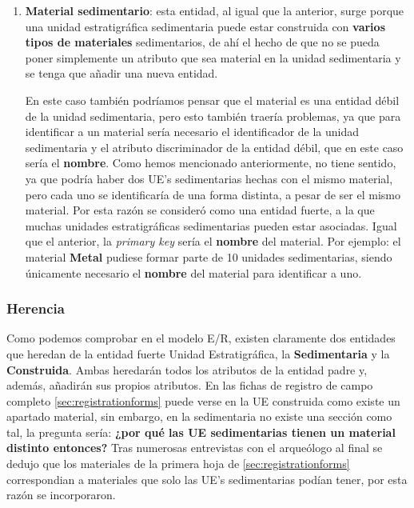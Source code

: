\begin{enumerate}
        \item \textbf{Material sedimentario}: esta entidad, al igual que la anterior, surge
        porque una unidad estratigráfica sedimentaria puede estar construida con 
        \textbf{varios tipos de materiales} sedimentarios, de ahí el hecho de que no se pueda
        poner simplemente un atributo que sea material en la unidad sedimentaria y se tenga que
        añadir una nueva entidad.

        En este caso también podríamos pensar que el material es una entidad débil de la unidad
        sedimentaria, pero esto también traería problemas, ya que para identificar a un material
        sería necesario el identificador de la unidad sedimentaria y el atributo discriminador
        de la entidad débil, que en este caso sería el \textbf{nombre}. Como hemos mencionado
        anteriormente, no tiene sentido, ya que podría haber dos UE's sedimentarias hechas
        con el mismo material, pero cada uno se identificaría de una forma distinta, a pesar
        de ser el mismo material. Por esta razón se consideró como una entidad fuerte, a la
        que muchas unidades estratigráficas sedimentarias pueden estar asociadas. Igual que el
        anterior, la \textit{primary key} sería el \textbf{nombre} del material. Por ejemplo: el
        material \textbf{Metal} pudiese formar parte de 10 unidades sedimentarias, siendo
        únicamente necesario el \textbf{nombre} del material para identificar a uno. 
    \end{enumerate}

    \subsubsection{Herencia}
    Como podemos comprobar en el modelo E/R, existen claramente dos entidades que heredan de
    la entidad fuerte Unidad Estratigráfica, la \textbf{Sedimentaria} y la \textbf{Construida}.
    Ambas heredarán todos los atributos de la entidad padre y, además, añadirán sus propios
    atributos. En las fichas de registro de campo completo \ref{sec:registrationforms} puede
    verse en la UE construida como existe un apartado material, sin embargo, en la sedimentaria
    no existe una sección como tal, la pregunta sería: \textbf{¿por qué las UE sedimentarias
    tienen un material distinto entonces?} Tras numerosas entrevistas con el arqueólogo al
    final se dedujo que los materiales de la primera hoja de \ref{sec:registrationforms}
    correspondian a materiales que solo las UE's sedimentarias podían tener, por esta razón
    se incorporaron.

